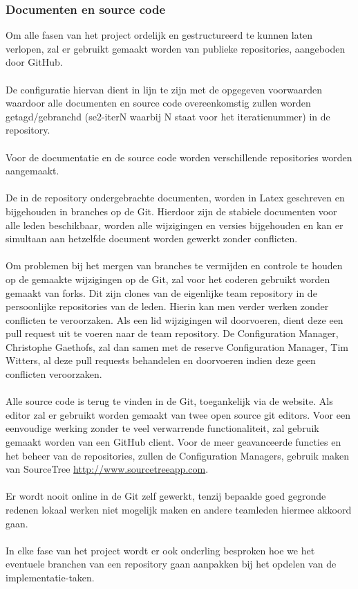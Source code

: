 \subsubsection{Documenten en source code}
Om alle fasen van het project ordelijk en gestructureerd te kunnen laten verlopen, zal er gebruikt gemaakt worden van publieke repositories, aangeboden door GitHub.
\\
\\
De configuratie hiervan dient in lijn te zijn met de opgegeven voorwaarden waardoor alle documenten en source code overeenkomstig zullen worden getagd/gebranchd (se2-iterN waarbij N staat voor het iteratienummer) in de repository.
\\
\\
Voor de documentatie en de source code worden verschillende repositories worden aangemaakt.
\\
\\
De in de repository ondergebrachte documenten, worden in Latex geschreven en bijgehouden in branches op de Git. Hierdoor zijn de stabiele documenten voor alle leden beschikbaar, worden alle wijzigingen en versies bijgehouden en kan er simultaan aan hetzelfde document worden gewerkt zonder conflicten.
\\
\\
Om problemen bij het mergen van branches te vermijden en controle te houden op de gemaakte wijzigingen op de Git, zal voor het coderen gebruikt worden gemaakt van forks. Dit zijn clones van de eigenlijke team repository in de persoonlijke repositories van de leden. Hierin kan men verder werken zonder conflicten te veroorzaken. Als een lid  wijzigingen wil doorvoeren, dient deze een pull request uit te voeren naar de team repository. De Configuration Manager, Christophe Gaethofs, zal dan samen met de reserve Configuration Manager, Tim Witters, al deze pull requests behandelen en doorvoeren indien deze geen conflicten veroorzaken.
\\
\\
Alle source code is terug te vinden in de Git, toegankelijk via de website. Als editor zal er gebruikt worden gemaakt van twee open source git editors. Voor een eenvoudige werking zonder te veel verwarrende functionaliteit, zal gebruik gemaakt worden van een GitHub client. Voor de meer geavanceerde functies en het beheer van de repositories, zullen de Configuration Managers, gebruik maken van SourceTree \url{http://www.sourcetreeapp.com}.
\\
\\
Er wordt nooit online in de Git zelf gewerkt, tenzij bepaalde goed gegronde redenen lokaal werken niet mogelijk maken en andere teamleden hiermee akkoord gaan.
\\
\\
In elke fase van het project wordt er ook onderling besproken hoe we het eventuele branchen van een repository gaan aanpakken bij het opdelen van de implementatie-taken.

